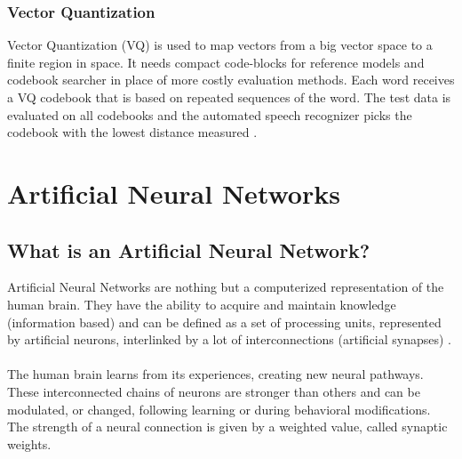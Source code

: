 \subsubsection{Vector Quantization}

Vector Quantization (VQ) is used to map vectors from a big vector space to a finite region in space. 
It needs compact code-blocks for reference models and codebook searcher in place of more costly evaluation methods. 
Each word receives a VQ codebook that is based on repeated sequences of the word.
The test data is evaluated on all codebooks and the automated speech recognizer picks the codebook with the lowest distance measured
\cite[p.~20-21]{togneri1990speech}.


\section{Artificial Neural Networks}
\subsection{What is an Artificial Neural Network?}
Artificial Neural Networks are nothing but a computerized representation of the human brain. 
They have the ability to acquire and maintain knowledge (information based) and can be defined as a set of processing units, represented by artificial neurons,
interlinked by a lot of interconnections
(artificial synapses) \cite[p.~5]{Silva2016}.\\\\
The human brain learns from its experiences, creating new neural pathways. These interconnected chains of neurons are stronger than others and can be modulated, or changed,
following learning or during behavioral modifications.
The strength of a neural connection is given by a weighted value, called synaptic weights.

